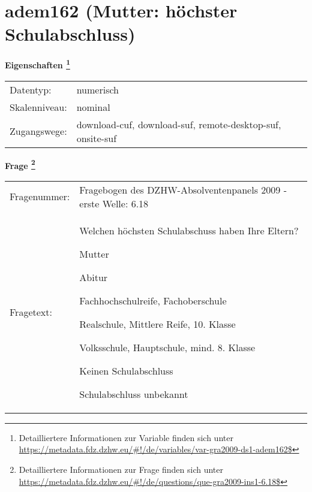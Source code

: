 
    \setcounter{footnote}{0}

    \vspace*{-1.8cm}
	\section{adem162 (Mutter: höchster Schulabschluss)}
	\label{section:adem162}



    \vspace*{0.5cm}
    \noindent\textbf{Eigenschaften
	\footnote{Detailliertere Informationen zur Variable finden sich unter
		\url{https://metadata.fdz.dzhw.eu/\#!/de/variables/var-gra2009-ds1-adem162$}}}\\
	\begin{tabularx}{\hsize}{@{}lX}
	Datentyp: & numerisch \\
	Skalenniveau: & nominal \\
	Zugangswege: &
	  download-cuf, 
	  download-suf, 
	  remote-desktop-suf, 
	  onsite-suf
 \\
    \end{tabularx}



				\vspace*{0.5cm}
                \noindent\textbf{Frage
	                \footnote{Detailliertere Informationen zur Frage finden sich unter
		              \url{https://metadata.fdz.dzhw.eu/\#!/de/questions/que-gra2009-ins1-6.18$}}}\\
				\begin{tabularx}{\hsize}{@{}lX}
					Fragenummer: &
					  Fragebogen des DZHW-Absolventenpanels 2009 - erste Welle:
					  6.18
 \\
					Fragetext: & Welchen höchsten Schulabschuss haben Ihre Eltern?\par  Mutter\par  Abitur\par  Fachhochschulreife, Fachoberschule\par  Realschule, Mittlere Reife, 10. Klasse\par  Volksschule, Hauptschule, mind. 8. Klasse\par  Keinen Schulabschluss\par  Schulabschluss unbekannt \\
				\end{tabularx}





